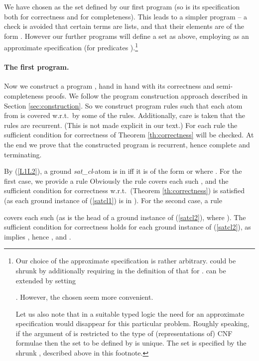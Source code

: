 \documentclass{tlp}
\begin{document}
We have chosen   as the set defined by our first program
(so  is its specification both for correctness and for completeness).
  This leads to a simpler program
-- a check is avoided that certain terms are lists, and that their elements
are of the form .
However our further programs will define a set  as above,
employing  as an approximate specification
(for predicates  ).\footnote{Our choice of the approximate specification is rather arbitrary.
     could be shrunk by additionally requiring
    in the definition of 
         that 
            for .
         can be extended by setting 
         
        \cite{drabent12.iclp}.
  However, the chosen  seem more convenient.

  Let us also note that in a suitable typed logic 
  the need for an approximate specification
  would disappear for this particular problem.  Roughly speaking,
  if the argument of  is restricted to the type of
  (representations of) CNF formulae then 
  the set to be defined by  is unique.
The set is specified by the shrunk , described above
  in this footnote.
} 


















\paragraph{The first program.}
Now we construct a program , hand in hand with its correctness and
semi-completeness proofs.
We follow the program construction approach described in Section
\ref{sec:construction}.
So we construct program rules such that
each atom from  is covered w.r.t.\  by some of the rules.
Additionally, care is taken that the rules are recurrent.
(This is not made explicit in our text.)
For each rule the sufficient condition for correctness of 
Theorem \ref{th:correctness} will be checked.
At the end we prove that the constructed program is recurrent, 
hence complete and terminating.






By (\ref{L1L2}),
a ground {\it sat\_cl}-atom is in  iff it is of the form
 or
 where .
For the first case, we provide a rule
Obviously the rule covers each such  , and the sufficient condition for
correctness w.r.t.\  (Theorem \ref{th:correctness}) is satisfied
(as each ground instance  of
(\ref{satcl1}) is in ).
For the second case, a rule
{\sloppy
    
}covers each such 
(as  is the head of a ground instance
 of (\ref{satcl2}),
where  ).
The sufficient condition for correctness holds for each ground instance of 
(\ref{satcl2}), as   implies 
, hence , and .
\end{document}
